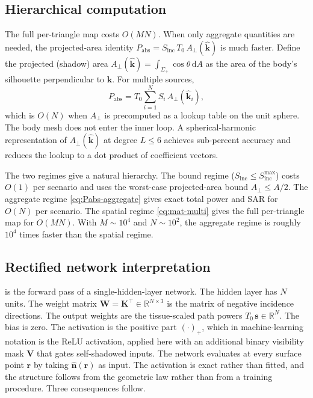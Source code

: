 \documentclass[journal,twocolumn,10pt]{IEEEtran}
\theoremstyle{plain}
\theoremstyle{remark}
\newcommand{\khat}{\hat{\bm{k}}}
\newcommand{\nhat}{\hat{\bm{n}}}
\newcommand{\rr}{\mathbf{r}}
\newcommand{\Sinc}{S_{\mathrm{inc}}}
\newcommand{\diff}{\mathrm{d}}
\begin{document}
\subsection{Hierarchical computation}
The full per-triangle map costs $O(MN)$. When only aggregate
quantities are needed, the projected-area identity $P_{\mathrm{abs}}
= \Sinc\,T_0\,A_\perp(\khat)$ is much faster. Define the
projected (shadow) area $A_\perp(\khat) = \int_{\Sigma_+}
\cos\theta\,\diff A$ as the area of the body's silhouette
perpendicular to $\khat$. For multiple sources,
\begin{equation}\label{eq:Pabs-aggregate}
  P_{\mathrm{abs}} = T_0 \sum_{i=1}^N S_i\,A_\perp(\khat_i),
\end{equation}
which is $O(N)$ when $A_\perp$ is precomputed as a lookup table on
the unit sphere. The body mesh does not enter the inner loop. A
spherical-harmonic representation of $A_\perp(\khat)$ at degree $L
\le 6$ achieves sub-percent accuracy and reduces the lookup to a dot
product of coefficient vectors.

The two regimes give a natural hierarchy. The bound regime ($\Sinc
\le \Sinc^{\max}$) costs $O(1)$ per scenario and uses the worst-case
projected-area bound $A_\perp \le A/2$. The aggregate regime
\eqref{eq:Pabs-aggregate} gives exact total power and SAR for $O(N)$
per scenario. The spatial regime \eqref{eq:mat-multi} gives the full
per-triangle map for $O(MN)$. With $M \sim 10^4$ and $N \sim 10^2$,
the aggregate regime is roughly $10^4$ times faster than the spatial
regime.

\subsection{Rectified network interpretation}
 is the forward pass of a single-hidden-layer
network. The hidden layer has $N$ units. The weight matrix
$\mathbf{W} = \mathbf{K}^\top \in \mathbb{R}^{N \times 3}$ is the
matrix of negative incidence directions. The output weights are the
tissue-scaled path powers $T_0\,\mathbf{s} \in \mathbb{R}^N$. The
bias is zero. The activation is the positive part $(\cdot)_+$, which
in machine-learning notation is the ReLU activation, applied here
with an additional binary visibility mask $\mathbf{V}$ that gates
self-shadowed inputs. The network evaluates at every surface point
$\rr$ by taking $\nhat(\rr)$ as input. The activation is exact rather
than fitted, and the structure follows from the geometric law rather
than from a training procedure. Three consequences follow.
\end{document}
